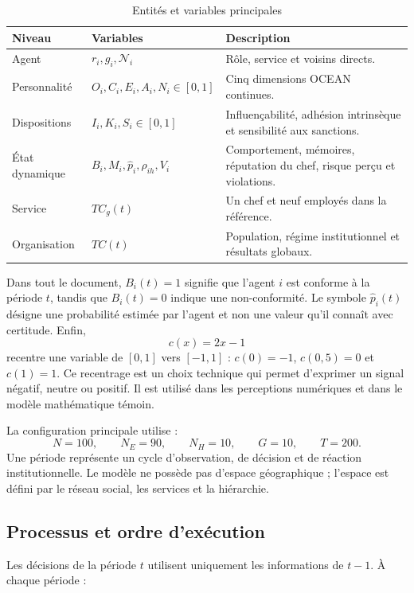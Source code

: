 \documentclass[10pt,a4paper]{article}
\begin{document}
\begin{table}[H]
\centering
\caption{Entités et variables principales}
\begin{tabularx}{\textwidth}{@{}L{31mm}L{38mm}Y@{}}
\toprule
{}
\color{white}\textbf{Niveau} &
\color{white}\textbf{Variables} &
\color{white}\textbf{Description}\\
\midrule
Agent &
$r_i,g_i,\mathcal N_i$ &
Rôle, service et voisins directs.\\
Personnalité &
$O_i,C_i,E_i,A_i,N_i\in[0,1]$ &
Cinq dimensions OCEAN continues.\\
Dispositions &
$I_i,K_i,S_i\in[0,1]$ &
Influençabilité, adhésion intrinsèque et sensibilité aux sanctions.\\
État dynamique &
{\small $B_i,M_i,\widehat p_i,\rho_{ih},V_i$} &
Comportement, mémoires, réputation du chef, risque perçu et violations.\\
Service &
$TC_g(t)$ &
Un chef et neuf employés dans la référence.\\
Organisation &
$TC(t)$ &
Population, régime institutionnel et résultats globaux.\\
\bottomrule
\end{tabularx}
\end{table}

Dans tout le document, $B_i(t)=1$ signifie que l’agent $i$ est conforme à la
période $t$, tandis que $B_i(t)=0$ indique une non-conformité. Le symbole
$\widehat p_i(t)$ désigne une probabilité estimée par l’agent et non une valeur
qu’il connaît avec certitude. Enfin,
\[
c(x)=2x-1
\]
recentre une variable de $[0,1]$ vers $[-1,1]$ : $c(0)=-1$, $c(0{,}5)=0$ et
$c(1)=1$. Ce recentrage est un choix technique qui permet d’exprimer un signal
négatif, neutre ou positif. Il est utilisé dans les perceptions numériques et
dans le modèle mathématique témoin.

La configuration principale utilise :
\[
N=100,\qquad N_E=90,\qquad N_H=10,\qquad G=10,\qquad T=200.
\]
Une période représente un cycle d’observation, de décision et de réaction
institutionnelle. Le modèle ne possède pas d’espace géographique ; l’espace est
défini par le réseau social, les services et la hiérarchie.

\subsection{Processus et ordre d’exécution}

Les décisions de la période $t$ utilisent uniquement les informations de
$t-1$. À chaque période :
\end{document}
